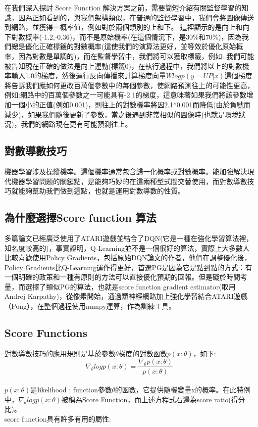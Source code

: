 \documentclass[14pt,a4paper]{report}  %
\begin{document}
 在我們深入探討 Score Function 解決方案之前，需要簡短介紹有關監督學習的知識，因為正如看到的，與我們架構類似，在普通的監督學習中，我們會將圖像傳送到網路，並獲得一概率值，例如對於兩個類別的上和下。 這裡顯示的是向上和向下對數概率(-1.2,-0.36)，而不是原始機率(在這個情況下，是30$\%$和70$\%$)，因為我們總是優化正確標籤的對數概率(這使我們的演算法更好，並等效於優化原始概率，因為對數是單調的)，而在監督學習中，我們將可以獲取標籤，例如:
我們可能被告知現在正確的做法是向上運動(標籤0)，在執行過程中，我們將以上的對數機率輸入1.0的梯度，然後運行反向傳播來計算梯度向量$Wlogp(y=UP|x)$這個梯度將告訴我們應如何更改百萬個參數中的每個參數，使網路預測往上的可能性更高，例如:網路中的百萬個參數之一可能具有-2.1的梯度，這意味著如果我們將該參數增加一個小的正值(例如0.001)，則往上的對數機率將因2.1*0.001而降低(由於負號而減少)，如果我們隨後更新了參數，當之後遇到非常相似的圖像時(也就是環境狀況)，我們的網路現在更有可能預測往上。\\

\subsection{對數導數技巧}
 機器學習涉及操縱機率。這個機率通常包含歸一化概率或對數概率。能加強解決現代機器學習問題的關鍵點，是能夠巧妙的在這兩種型式間交替使用，而對數導數技巧就能夠幫助我們做到這點，也就是運用對數導數的性質。\\
\subsection{為什麼選擇Score function 算法}
 多篇論文已經廣泛使用了ATARI遊戲並結合了DQN(它是一種在強化學習算法裡，知名度較高的)，事實證明，Q-Learning並不是一個很好的算法，實際上大多數人比較喜歡使用Policy Gradients，包括原始DQN論文的作者，他們在調整優化後，Policy Gradients比Q-Learning運作得更好，首選PG是因為它是點到點的方式：有一個明確的政策和一種有原則的方法可以直接優化預期的回報。但是礙於時間考量，而選擇了類似PG的算法，也就是score function gradient estimator(取用Andrej Karpathy)，從像素開始，通過類神經網路加上強化學習結合ATARI遊戲（Pong），在整個過程使用numpy運算，作為訓練工具。\\ 
\subsection{Score Functions}
 對數導數技巧的應用規則是基於參數$\theta$梯度的對數函數$p(x:\theta)$，如下:\\
$$\nabla_\theta logp(x:\theta)=\frac{\nabla_\theta p(x:\theta)}{p(x:\theta)}$$\\
$p(x:\theta)$是likelihood ; function參數$\theta$的函數，它提供隨機變量x的概率。在此特例中，$\nabla_\theta logp(x:\theta)$被稱為Score Function，而上述方程式右邊為score ratio(得分比)。\\
score function具有許多有用的屬性:\\
\end{document}
